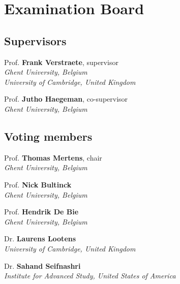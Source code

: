 \chapter*{Examination Board}
\section*{Supervisors}
\bigskip\noindent  Prof. {\bf Frank Verstraete}, supervisor \\
\emph{Ghent University, Belgium \\ University of Cambridge, United Kingdom}

\bigskip\noindent  Prof. {\bf Jutho Haegeman}, co-supervisor \\
\emph{Ghent University, Belgium}
\bigskip
\section*{Voting members}
\bigskip\noindent Prof. {\bf Thomas Mertens}, chair \\
\emph{Ghent University, Belgium}
	
\bigskip\noindent Prof. {\bf Nick Bultinck} \\
\emph{Ghent University, Belgium}

\bigskip\noindent  Prof. {\bf Hendrik De Bie} \\
\emph{Ghent University, Belgium}

\bigskip\noindent  Dr. {\bf Laurens Lootens} \\
\emph{University of Cambridge, United Kingdom}

\bigskip\noindent  Dr. {\bf Sahand Seifnashri} \\
\emph{Institute for Advanced Study, United States of America}
